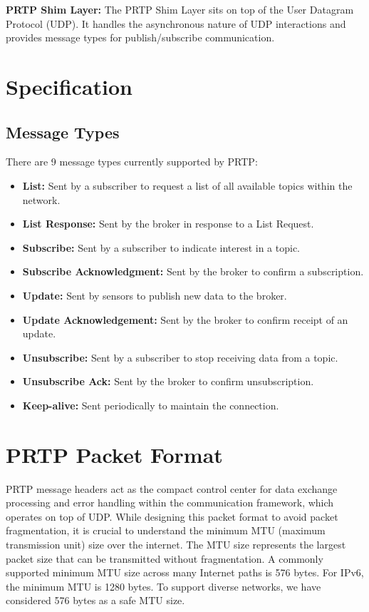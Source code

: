 \documentclass[lettersize,journal]{IEEEtran}
\begin{document}
\textbf{PRTP Shim Layer:} The PRTP Shim Layer sits on top of the User Datagram Protocol (UDP). It handles the asynchronous nature of UDP interactions and provides message types for publish/subscribe communication.

\section{Specification}
\subsection{Message Types}
There are 9 message types currently supported by PRTP:
\begin{itemize}
    \item \textbf{List:} Sent by a subscriber to request a list of all available topics within the network.
    \item \textbf{List Response:} Sent by the broker in response to a List Request.
    \item \textbf{Subscribe:} Sent by a subscriber to indicate interest in a topic.
    \item \textbf{Subscribe Acknowledgment:} Sent by the broker to confirm a subscription.
    \item \textbf{Update:} Sent by sensors to publish new data to the broker.
    \item \textbf{Update Acknowledgement:} Sent by the broker to confirm receipt of an update.
    \item \textbf{Unsubscribe:} Sent by a subscriber to stop receiving data from a topic.
    \item \textbf{Unsubscribe Ack:} Sent by the broker to confirm unsubscription.
    \item \textbf{Keep-alive:} Sent periodically to maintain the connection.
\end{itemize}

\section{PRTP Packet Format}
PRTP message headers act as the compact control center for data exchange processing and error handling within the communication framework, which operates on top of UDP. While designing this packet format to avoid packet fragmentation, it is crucial to understand the minimum MTU (maximum transmission unit) size over the internet. The MTU size represents the largest packet size that can be transmitted without fragmentation. A commonly supported minimum MTU size across many Internet paths is 576 bytes. For IPv6, the minimum MTU is 1280 bytes. To support diverse networks, we have considered 576 bytes as a safe MTU size.
\end{document}
